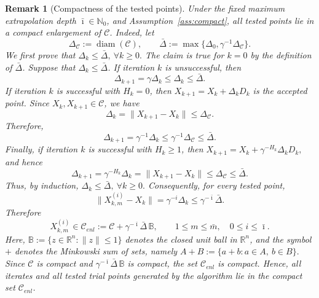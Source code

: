 \documentclass[11pt,a4paper]{article}
\newtheorem{remark}{Remark}[section]
\newcommand{\Imax}{\bar{\imath}}%
\newcommand{\sara}[1]{{\color{red}{\textbf{[SS: #1]}}\color{black}}}
\newcommand{\Ant}[1]{\textcolor{magenta}{#1}}
\begin{document}
\begin{remark}[Compactness of the tested points]
\label{rem:compact-tested-points}
Under the fixed maximum extrapolation depth
\(\Imax\in\mathbb N_0\),
and Assumption~\ref{ass:compact}, all tested points lie in a compact
enlargement of \({\mathcal C}\). Indeed, let
\[
    \Delta_{\mathcal C}:=\operatorname{diam}({\mathcal C}),
    \qquad
    \bar\Delta:=\max\{\Delta_0,\gamma^{-1}\Delta_{\mathcal C}\}.
\]
We first prove that $\Delta_k\le \bar\Delta,
    \ \forall k\ge0.$
The claim is true for \(k=0\) by the definition of \(\bar\Delta\). Suppose that
\(\Delta_k\le\bar\Delta\). If iteration \(k\) is unsuccessful, then
\[
    \Delta_{k+1}=\gamma\Delta_k\le\Delta_k\le\bar\Delta.
\]
If iteration \(k\) is successful with \(H_k=0\), then 
$  X_{k+1}=X_k+\Delta_kD_k$ is the accepted point.
Since \(X_k,X_{k+1}\in {\mathcal C}\), we have
\[
    \Delta_k=\|X_{k+1}-X_k\|\le \Delta_{\mathcal C}.
\]
Therefore,
\[
    \Delta_{k+1}=\gamma^{-1}\Delta_k\le\gamma^{-1}\Delta_{\mathcal C}\le\bar\Delta.
\]
Finally, if iteration \(k\) is successful with \(H_k\ge1\), then $X_{k+1}=X_k+\gamma^{-H_k}\Delta_kD_k,$ and hence
\[
    \Delta_{k+1}
    =
    \gamma^{-H_k}\Delta_k
    =
    \|X_{k+1}-X_k\|
    \le
    \Delta_{\mathcal C}
    \le
    \bar\Delta.
\]  
Thus, by induction, $\Delta_k\le\bar\Delta, \ \forall k\ge0.$
Consequently, for every tested point,
\[
    \|X_{k,m}^{(i)}-X_k\|
    =
    \gamma^{-i}\Delta_k
    \le
    \gamma^{-\Imax}\bar\Delta.
\]
Therefore
\[
    X_{k,m}^{(i)}
    \in
    {{\mathcal C}_{enl}}
    :=
    {\mathcal C}+\gamma^{-\Imax}\bar\Delta\,\mathbb B,
    \qquad
    1\le m\le \bar{m},\quad 0\le i\le \Imax.
\]
Here,
\(
    \mathbb B:=\{z\in\mathbb R^n:\|z\|\le 1\}
\)
denotes the closed unit ball in \(\mathbb R^n\), and the symbol \(+\) denotes
the Minkowski sum of sets, namely
\(
    A+B:=\{a+b:a\in A,\ b\in B\}.
\)
Since \({\mathcal C}\) is compact and \(\gamma^{-\Imax}\bar\Delta\,\mathbb B\) is
compact, the set  ${\mathcal C}_{enl}$ is compact. Hence, all iterates and all tested trial
points generated by the algorithm lie in the compact set ${\mathcal C}_{enl}$.
\end{remark}
\end{document}
